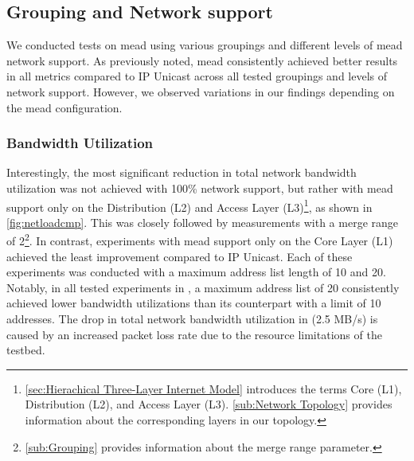 \subsection{Grouping and Network support} %
\label{sub:Results_Grouping and Network support}

We conducted tests on \gls{mead} using various groupings and different levels of
    \gls{mead} network support.
As previously noted, \gls{mead} consistently achieved better results in all
    metrics compared to IP Unicast across all tested groupings and levels of
    network support.
However, we observed variations in our findings depending on the \gls{mead}
    configuration.

\subsubsection{Bandwidth Utilization}
Interestingly, the most significant reduction in total network bandwidth
    utilization was not achieved with 100\% network support, but rather with
    \gls{mead} support only on the Distribution (L2) and Access Layer (L3)\footnote{
        \autoref{sec:Hierachical Three-Layer Internet Model} introduces the terms Core
            (L1), Distribution (L2), and Access Layer (L3).
        \autoref{sub:Network Topology} provides information about the corresponding
            layers in our topology.
    }, as shown in \autoref{fig:netloadcmp}.
This was closely followed by measurements with a merge range of 2\footnote{
        \autoref{sub:Grouping} provides information about the merge range parameter.
    }.
In contrast, experiments with \gls{mead} support only on the Core Layer (L1)
    achieved the least improvement compared to IP Unicast.
Each of these experiments was conducted with a maximum address list length of
    10 and 20.
Notably, in all tested experiments in \uci{}, a maximum address list of 20
    consistently achieved lower bandwidth utilizations than its counterpart
    with a limit of 10 addresses.
The drop in total network bandwidth utilization in \uci{} (2.5 MB/s) is caused
    by an increased packet loss rate due to the resource limitations of the
    testbed.

